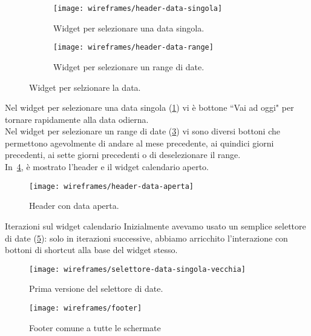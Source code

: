 \documentclass[../../../main.tex]{subfiles}
\begin{document}
\begin{figure}[H]
    \begin{subfigure}[b]{0.5\textwidth}
        \centering
        \texttt{[image: wireframes/header-data-singola]}
        \caption{Widget per selezionare una data singola.}
        \label{fig:header-data-singola}
    \end{subfigure}
\hfill
    \begin{subfigure}[b]{0.5\textwidth}
        \centering
        \texttt{[image: wireframes/header-data-range]}
        \caption{Widget per selezionare un range di date.}
        \label{fig:header-data-range}
    \end{subfigure}
    \caption{Widget per selzionare la data.}
\end{figure}


Nel widget per selezionare una data singola (\ref{fig:header-data-singola}) vi è bottone ``Vai ad oggi" per tornare rapidamente alla data odierna.\\
Nel widget per selezionare un range di date (\ref{fig:header-data-range}) vi sono diversi bottoni che permettono agevolmente di andare al mese precedente, ai quindici giorni precedenti, ai sette giorni precedenti o di deselezionare il range.\\
In~\ref{fig:header-data-aperta}, è mostrato l'header e il widget calendario aperto.

\begin{figure}[H]
    \centering
    \texttt{[image: wireframes/header-data-aperta]}
    \caption{Header con data aperta.}\label{fig:header-data-aperta}
\end{figure}

\begin{bclogo}{Iterazioni sul widget calendario}
    Inizialmente avevamo usato un semplice selettore di date (\ref{fig:selettore-data-singola-vecchia}): solo in iterazioni successive, abbiamo arricchito l'interazione con bottoni di shortcut alla base del widget stesso.
\begin{figure}[H]
    \centering
    \texttt{[image: wireframes/selettore-data-singola-vecchia]}
    \caption{Prima versione del selettore di date.}\label{fig:selettore-data-singola-vecchia}
\end{figure}
\end{bclogo}

\begin{figure}[H]
    \centering
    \texttt{[image: wireframes/footer]}
    \caption{Footer comune a tutte le schermate}
    \label{fig:footer}
\end{figure}
\end{document}
